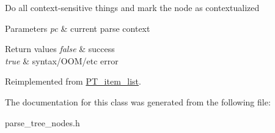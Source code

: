 Do all context-\/sensitive things and mark the node as contextualized


\begin{DoxyParams}{Parameters}
{\em pc} & current parse context\\
\hline
\end{DoxyParams}

\begin{DoxyRetVals}{Return values}
{\em false} & success \\
\hline
{\em true} & syntax/\+O\+O\+M/etc error \\
\hline
\end{DoxyRetVals}


Reimplemented from \mbox{\hyperlink{classPT__item__list_a5ddeca0fe325bc50ddcf4bd17da8efa8}{P\+T\+\_\+item\+\_\+list}}.



The documentation for this class was generated from the following file\+:\begin{DoxyCompactItemize}
\item 
parse\+\_\+tree\+\_\+nodes.\+h\end{DoxyCompactItemize}
